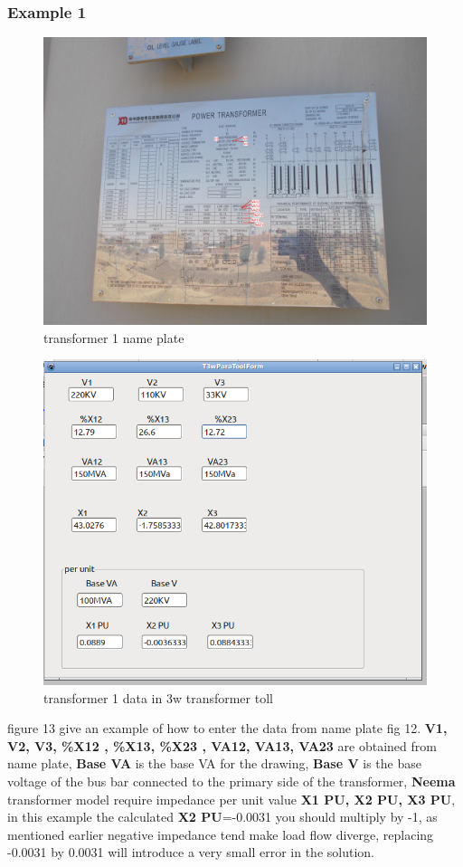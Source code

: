 \documentclass{article}
\begin{document}
\subsubsection{Example 1}
\begin{figure}[H]
	\includegraphics[width=\linewidth]{MHDTR01.jpg}
	\caption{transformer 1 name plate }
	\label{fig:TR01}
\end{figure}
\begin{figure}[H]
	\includegraphics[width=\linewidth]{MHDTR01Tool.png}
	\caption{transformer 1 data in 3w transformer toll }
	\label{fig:TR01}
\end{figure}
	figure 13 give an example of how to enter the data from name plate fig 12.
	\textbf{V1, V2, V3, \%X12 , \%X13, \%X23 , VA12, VA13, VA23} are obtained from name plate, \textbf{Base VA} is the base VA for the drawing, \textbf{Base V} is the base voltage of the bus bar connected to the primary side of the transformer, \textbf{Neema} transformer model require impedance per unit value \textbf{X1 PU, X2 PU, X3 PU}, in this example the calculated \textbf{X2 PU}=-0.0031 you should multiply by -1, as mentioned earlier negative impedance tend make  load flow diverge, replacing -0.0031 by 0.0031  will introduce a very small error in the solution.
	\newpage
\end{document}
